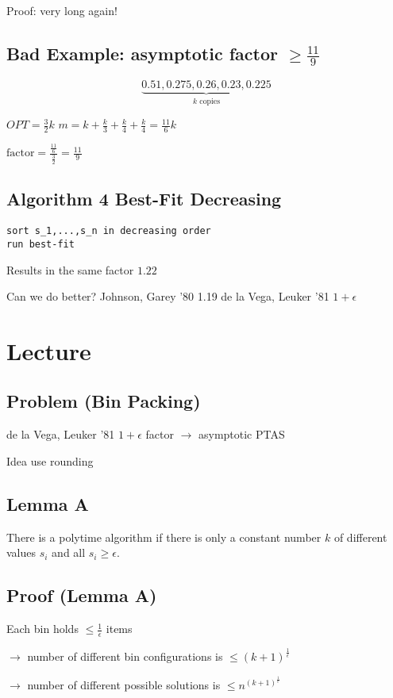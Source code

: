 \documentclass[english,12pt]{article}
\theoremstyle{plain}
\theoremstyle{definition}
\theoremstyle{definition} %
\begin{document}
Proof: very long again!

\subsection{Bad Example: asymptotic factor $\ge\frac{11}{9}$}
\[\underbrace{0.51,0.275,0.26,0.23,0.225}_{k\text{ copies}}\]

$OPT=\frac{3}{2}k$
$m = k + \frac{k}{3}+ \frac{k}{4}+ \frac{k}{4}=\frac{11}{6}k$

$\text{factor}=\frac{\frac{11}{6}}{\frac{3}{2}}=\frac{11}{9}$


\subsection{Algorithm 4 Best-Fit Decreasing}
\begin{verbatim}
sort s_1,...,s_n in decreasing order
run best-fit
\end{verbatim}
Results in the same factor $1.22$

Can we do better?
Johnson, Garey '80 1.19
de la Vega, Leuker '81 $1+\epsilon$


\section{Lecture}
\subsection{Problem (Bin Packing)}

de la Vega, Leuker '81 $1+\epsilon$ factor $\rightarrow$ asymptotic PTAS

Idea use rounding
\subsection{Lemma A}
There is a polytime algorithm if there is only a constant number $k$ of different values $s_i$ and all $s_i\ge \epsilon$.

\subsection{Proof (Lemma A)}
Each bin holds $\le \frac{1}{\epsilon}$ items

$\rightarrow$ number of different bin configurations is $\le (k+1)^{\frac{1}{\epsilon}}$

$\rightarrow$ number of different possible solutions is $\le n^{(k+1)^{\frac{1}{\epsilon}}}$
\end{document}
